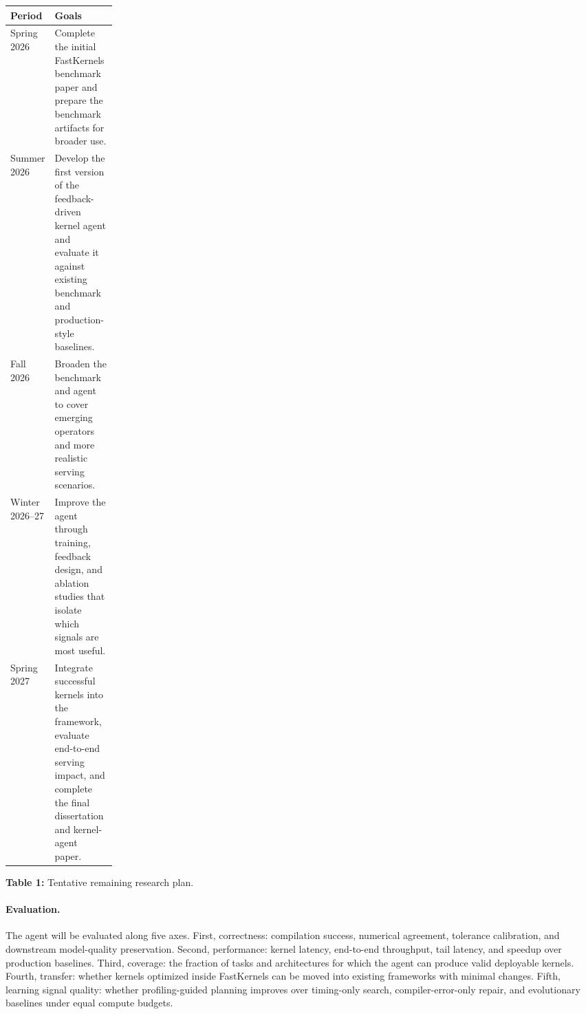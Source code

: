 \documentclass[11pt]{article}
\newcommand{\FastKernels}{FastKernels}
\begin{document}
\begin{center}
\small
\begin{tabularx}{\linewidth}{@{}p{0.18\linewidth}X@{}}
\toprule
\textbf{Period} & \textbf{Goals} \\
\midrule
Spring 2026 & Complete the initial \FastKernels{} benchmark paper and prepare the benchmark artifacts for broader use. \\
Summer 2026 & Develop the first version of the feedback-driven kernel agent and evaluate it against existing benchmark and production-style baselines. \\
Fall 2026 & Broaden the benchmark and agent to cover emerging operators and more realistic serving scenarios. \\
Winter 2026--27 & Improve the agent through training, feedback design, and ablation studies that isolate which signals are most useful. \\
Spring 2027 & Integrate successful kernels into the framework, evaluate end-to-end serving impact, and complete the final dissertation and kernel-agent paper. \\
\bottomrule
\end{tabularx}

\vspace{0.5em}
\textbf{Table 1:} Tentative remaining research plan.
\end{center}

\paragraph{Evaluation.}
The agent will be evaluated along five axes. First, correctness: compilation success, numerical agreement, tolerance calibration, and downstream model-quality preservation. Second, performance: kernel latency, end-to-end throughput, tail latency, and speedup over production baselines. Third, coverage: the fraction of tasks and architectures for which the agent can produce valid deployable kernels. Fourth, transfer: whether kernels optimized inside \FastKernels{} can be moved into existing frameworks with minimal changes. Fifth, learning signal quality: whether profiling-guided planning improves over timing-only search, compiler-error-only repair, and evolutionary baselines under equal compute budgets.
\end{document}
